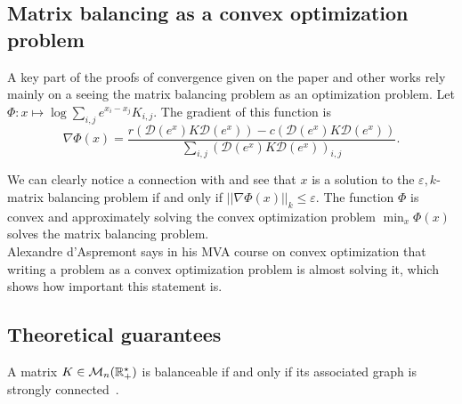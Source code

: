 \subsection{Matrix balancing as a convex optimization problem}

A key part of the proofs of convergence given on the paper and other works rely mainly on a seeing the matrix balancing problem as an optimization problem. Let \(\Phi : x \mapsto \log \sum_{i,j} e^{x_i - x_j} K_{i,j}\). The gradient of this function is 
\[
    \nabla \Phi (x) = \dfrac{r\left( \mathcal D(e^x)K\mathcal D(e^{x}) \right) - c\left( \mathcal D(e^x)K\mathcal D(e^{x}) \right)}{\sum_{i,j}\left( \mathcal D(e^x)K\mathcal D(e^{x}) \right)_{i,j}}.    
\]

We can clearly notice a connection with  and see that \(x\) is a solution to the \(\varepsilon, k\)-matrix balancing problem if and only if \(||\nabla \Phi(x)||_k \leq \varepsilon\). The function \(\Phi\) is convex and approximately solving the convex optimization problem \(\min_x \Phi(x)\) solves the matrix balancing problem.\\

Alexandre d'Aspremont says in his MVA course on convex optimization that writing a problem as a convex optimization problem is almost solving it, which shows how important this statement is.

\subsection{Theoretical guarantees}\label{theoritical}

\begin{lemma}\label{balanceability}
    A matrix \(K \in \mathcal M_n(\mathbb{R}_+^\star)\) is balanceable if and only if its associated graph is strongly connected~\cite{osborne1960pre}.
\end{lemma}



